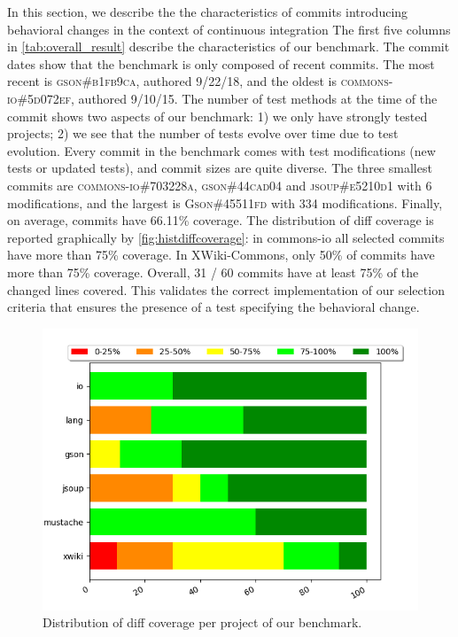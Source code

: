 In  this section, we describe the the characteristics of commits introducing behavioral changes in the context of continuous integration
The first five columns in \autoref{tab:overall_result} describe the characteristics of our benchmark.
The commit dates show that the benchmark is only composed of recent commits.
The most recent is \textsc{gson\#b1fb9ca}, authored 9/22/18, and the oldest is \textsc{commons-io\#5d072ef}, authored 9/10/15.
The number of test methods at the time of the commit shows two aspects of our benchmark:
1) we only have strongly tested projects;
2) we see that the number of tests evolve over time
due to test evolution.
Every commit in the benchmark comes with test modifications (new tests or updated tests), and commit sizes are quite diverse.
The three smallest commits are \textsc{commons-io\#703228a}, \textsc{gson\#44cad04} and \textsc{jsoup\#e5210d1} with 6 modifications, and the largest is \textsc{Gson\#45511fd} with 334 modifications.
%
Finally, 
on average, commits have 66.11\% coverage. 
The distribution of diff coverage is reported graphically by \autoref{fig:histdiffcoverage}: 
in commons-io all selected commits have more than 75\% coverage.
In XWiki-Commons, only 50\% of commits have more than 75\% coverage. Overall, 31 / 60 commits have at least 75\% of the changed lines covered.
This validates the correct implementation of our selection criteria that ensures the presence of a test specifying the behavioral change.

\begin{figure}
\centering
\includegraphics[width=.95\linewidth]{img/diff_cov_hist.png}
\caption{Distribution of diff coverage per project of our benchmark.}
\label{fig:histdiffcoverage}
\end{figure}

